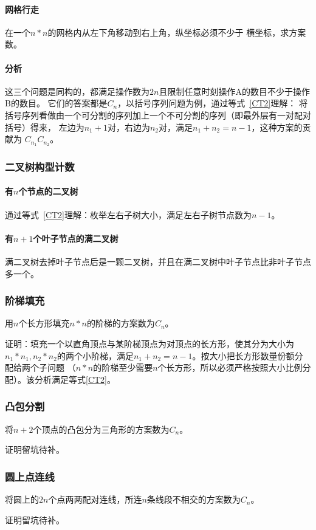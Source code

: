 \paragraph{网格行走} 在一个$n*n$的网格内从左下角移动到右上角，纵坐标必须不少于
横坐标，求方案数。
\paragraph{分析}
这三个问题是同构的，都满足操作数为$2n$且限制任意时刻操作A的数目不少于操作B的数目。
它们的答案都是$C_n$，以括号序列问题为例，通过等式~\ref{CT2}理解：
将括号序列看做由一个可分割的序列加上一个不可分割的序列（即最外层有一对配对括号）得来，
左边为$n_1+1$对，右边为$n_2$对，满足$n_1+n_2=n-1$，这种方案的贡献为
$C_{n_1}C_{n_2}$。
\subsubsection{二叉树构型计数}
\paragraph{有$n$个节点的二叉树}
通过等式~\ref{CT2}理解：枚举左右子树大小，满足左右子树节点数为$n-1$。
\paragraph{有$n+1$个叶子节点的满二叉树}
满二叉树去掉叶子节点后是一颗二叉树，并且在满二叉树中叶子节点比非叶子节点多一个。
\subsubsection{阶梯填充}
用$n$个长方形填充$n*n$的阶梯的方案数为$C_n$。

证明：填充一个以直角顶点与某阶梯顶点为对顶点的长方形，使其分为大小为
$n_1*n_1,n_2*n_2$的两个小阶梯，满足$n_1+n_2=n-1$。按大小把长方形数量份额分配给两个子问题
（$n*n$的阶梯至少需要$n$个长方形，所以必须严格按照大小比例分配）。该分析满足等式\ref{CT2}。
\subsubsection{凸包分割}
将$n+2$个顶点的凸包分为三角形的方案数为$C_n$。

证明留坑待补。
\subsubsection{圆上点连线}
将圆上的$2n$个点两两配对连线，所连$n$条线段不相交的方案数为$C_n$。

证明留坑待补。

